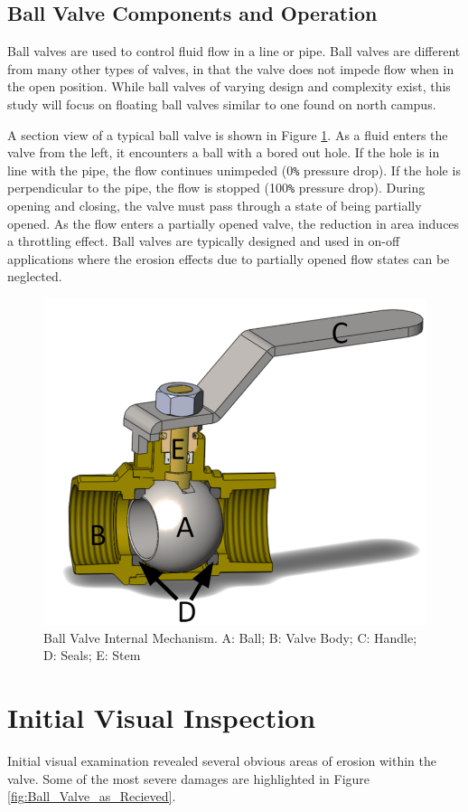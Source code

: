 \documentclass[]{article}
\begin{document}
\subsection{Ball Valve Components and Operation}
Ball valves are used to control fluid flow in a line or pipe. Ball valves are different from many other types of valves, in that the valve does not impede flow when in the open position. While ball valves of varying design and complexity exist, this study will focus on floating ball valves similar to one found on north campus. 

A section view of a typical ball valve is shown in Figure \ref{fig:cutview}. As a fluid enters the valve from the left, it encounters a ball with a bored out hole. If the hole is in line with the pipe, the flow continues unimpeded (0\verb|%| pressure drop). If the hole is perpendicular to the pipe, the flow is stopped (100\verb|%| pressure drop). During opening and closing, the valve must pass through a state of being partially opened. As the flow enters a partially opened valve, the reduction in area induces a throttling effect. Ball valves are typically designed and used in on-off applications where the erosion effects due to partially opened flow states can be neglected.


\begin{figure}[h]
	\centering
	\includegraphics[width=0.33\linewidth]{Photos/CutView}
	\caption{Ball Valve Internal Mechanism. A: Ball; B: Valve Body; C: Handle; D: Seals; E: Stem}
	\label{fig:cutview}
\end{figure}

\section{Initial Visual Inspection}
Initial visual examination revealed several obvious areas of erosion within the valve. Some of the most severe damages are highlighted in Figure \ref{fig:Ball_Valve_as_Recieved}. 
\end{document}
